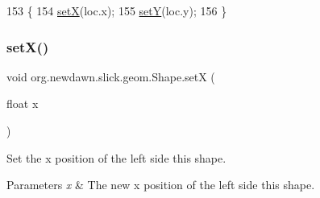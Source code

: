 \begin{DoxyCode}
153                                           \{
154         \mbox{\hyperlink{classorg_1_1newdawn_1_1slick_1_1geom_1_1_shape_a1469b8ef682642c4257869640c27bf16}{setX}}(loc.x);
155         \mbox{\hyperlink{classorg_1_1newdawn_1_1slick_1_1geom_1_1_shape_a7a127d0dea9bd7f0e3ce3fd0a61268fc}{setY}}(loc.y);
156     \}
\end{DoxyCode}
\mbox{\label{classorg_1_1newdawn_1_1slick_1_1geom_1_1_shape_a1469b8ef682642c4257869640c27bf16}} 
\subsubsection{\texorpdfstring{set\+X()}{setX()}}
{\footnotesize\ttfamily void org.\+newdawn.\+slick.\+geom.\+Shape.\+setX (\begin{DoxyParamCaption}\item[{float}]{x }\end{DoxyParamCaption})\hspace{0.3cm}{\ttfamily [inline]}}

Set the x position of the left side this shape.


\begin{DoxyParams}{Parameters}
{\em x} & The new x position of the left side this shape. \\
\hline
\end{DoxyParams}

